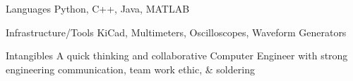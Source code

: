 

\begin{cvskills}

  \cvskill
    {Languages} %
    {Python, C++, Java, MATLAB}



  \cvskill
    {Infrastructure/Tools} %
    {KiCad, Multimeters, Oscilloscopes, Waveform Generators} %

  \cvskill
    {Intangibles} %
    {A quick thinking and collaborative Computer Engineer with strong engineering communication, team work ethic, \& soldering} %



\end{cvskills}

